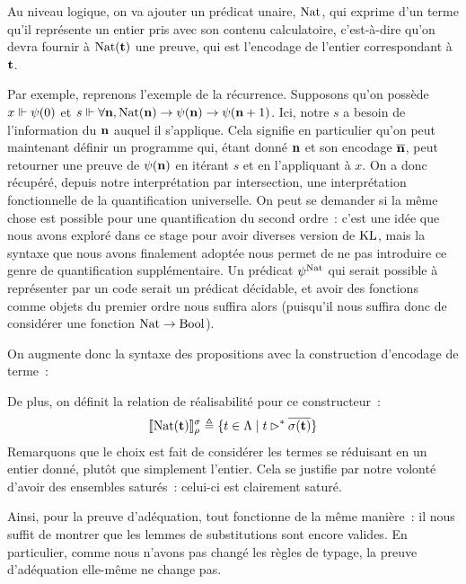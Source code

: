 \documentclass{article}
\begin{document}
Au niveau logique, on va ajouter un prédicat unaire, $\Nat$, qui exprime d'un terme qu'il représente un entier pris avec son contenu calculatoire, c'est-à-dire qu'on devra fournir à $\Nat(\bt)$ une preuve, qui est l'encodage de l'entier correspondant à $\bt$.

Par exemple, reprenons l'exemple de la récurrence. Supposons qu'on possède $x\reali \psi(0)$ et $s\reali \forall \bn, \Nat(\bn) \to \psi(\bn) \to \psi(\bn+1)$. Ici, notre $s$ a besoin de l'information du $\bn$ auquel il s'applique. Cela signifie en particulier qu'on peut maintenant définir un programme qui, étant donné $\bn$ et son encodage $\overline{\bn}$, peut retourner une preuve de $\psi(\bn)$ en itérant $s$ et en l'appliquant à $x$. On a donc récupéré, depuis notre interprétation par intersection, une interprétation fonctionnelle de la quantification universelle. On peut se demander si la même chose est possible pour une quantification du second ordre~: c'est une idée que nous avons exploré dans ce stage pour avoir diverses version de $\KL$, mais la syntaxe que nous avons finalement adoptée nous permet de ne pas introduire ce genre de quantification supplémentaire. Un prédicat $\psi^{\Nat}$ qui serait possible à représenter par un code serait un prédicat décidable, et avoir des fonctions comme objets du premier ordre nous suffira alors (puisqu'il nous suffira donc de considérer une fonction $\Nat\to\Bool$).

On augmente donc la syntaxe des propositions avec la construction d'encodage de terme~:
\begin{center}
    \begin{prooftree}
    \end{prooftree}
\end{center}

De plus, on définit la relation de réalisabilité pour ce constructeur~:
\[\trad{\Nat(\bt)}_\rho^\sigma \defeq \{t\in \Lambda\mid t \rhd^* \overline{\sigma(\bt)}\}\]
Remarquons que le choix est fait de considérer les termes se réduisant en un entier donné, plutôt que simplement l'entier. Cela se justifie par notre volonté d'avoir des ensembles saturés~: celui-ci est clairement saturé.

Ainsi, pour la preuve d'adéquation, tout fonctionne de la même manière~: il nous suffit de montrer que les lemmes de substitutions sont encore valides. En particulier, comme nous n'avons pas changé les règles de typage, la preuve d'adéquation elle-même ne change pas.
\end{document}

